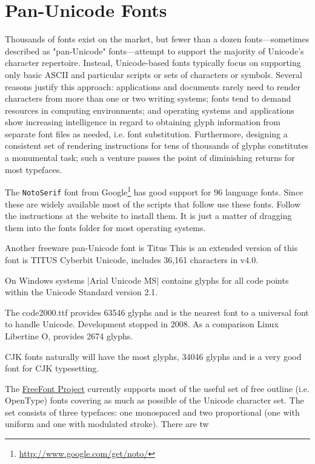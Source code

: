\section{Pan-Unicode Fonts}

Thousands of fonts exist on the market, but fewer than a dozen fonts—sometimes described as "pan-Unicode" fonts—attempt to support the majority of Unicode's character repertoire. Instead, Unicode-based fonts typically focus on supporting only basic ASCII and particular scripts or sets of characters or symbols. Several reasons justify this approach: applications and documents rarely need to render characters from more than one or two writing systems; fonts tend to demand resources in computing environments; and operating systems and applications show increasing intelligence in regard to obtaining glyph information from separate font files as needed, i.e. font substitution. Furthermore, designing a consistent set of rendering instructions for tens of thousands of glyphs constitutes a monumental task; such a venture passes the point of diminishing returns for most typefaces.

The \texttt{NotoSerif} font from Google\footnote{\protect\url{http://www.google.com/get/noto/}} has good support for 96 language fonts. Since these are widely available most of the scripts that follow use these fonts. Follow the instructions at the website to install them. It is just a matter of dragging them into the fonts folder for most operating systems.

Another freeware pan-Unicode font is Titus
This is an extended version of this font is TITUS Cyberbit Unicode, includes 36,161 characters in v4.0.

On Windows systems |Arial Unicode MS| contains glyphs for all code points within the Unicode Standard version 2.1.  

The code2000.ttf provides 63546 glyphs and is the nearest font to a universal font to handle Unicode. Development stopped in 2008. As a comparison Linux Libertine O, provides 2674 glyphs. 

CJK fonts naturally will have the most glyphs,  34046 glyphs and is a very good font for CJK typesetting.

The \href{http://ftp.gnu.org/gnu/freefont/}{FreeFont Project} currently supports most of the useful set of free outline (i.e. OpenType) fonts covering as much as possible of the Unicode character set. The set consists of three typefaces: one monospaced and two proportional (one with uniform and one with modulated stroke). There are tw

